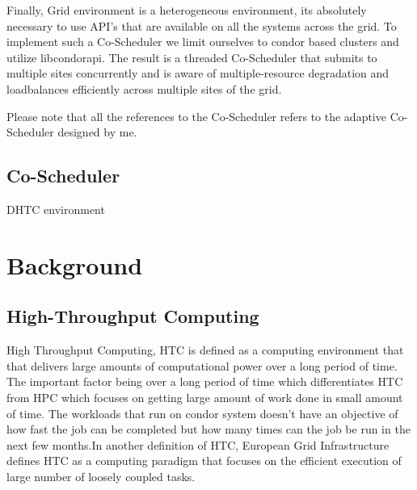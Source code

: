\documentclass[ms,electronic,double]{nuthesis}
\begin{document}
Finally, Grid environment is a heterogeneous environment, its absolutely necessary
to use API's that are available on all the systems across the grid. To implement such a Co-Scheduler
 we limit ourselves to condor based clusters and utilize libcondorapi. The result is a threaded Co-Scheduler 
that submits to multiple sites concurrently and is aware of multiple-resource degradation and
loadbalances efficiently across multiple sites of the grid. 

Please note that all the references to the Co-Scheduler refers to the adaptive Co-Scheduler designed 
by me.  
\section{Co-Scheduler}

DHTC environment


\chapter{Background}

\section{High-Throughput Computing} High Throughput Computing, HTC is defined as 
a computing environment that that delivers large amounts of computational
power over a long period of time.  The important factor being over a long period of time which 
differentiates HTC from HPC which focuses on getting large amount of work done in small amount of time.
The workloads that run on condor system doesn't have an objective of  how fast the job can be completed 
but how many times can the job be run in the next few months.In another definition of HTC, European Grid  
Infrastructure defines HTC as a computing paradigm that focuses on the efficient 
execution of large number of loosely coupled tasks.
\end{document}
